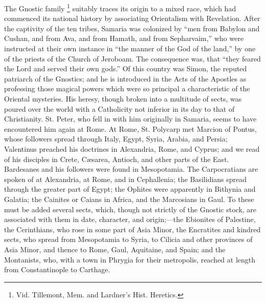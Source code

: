 The Gnostic family \footnote{Vid. Tillemont, Mem. and
Lardner's Hist. Heretics.} suitably traces its origin
to a mixed race, which had commenced its national history
by associating Orientalism with Revelation. After the
captivity of the ten tribes, Samaria was colonized by
``men from Babylon and Cushan, and from Ava, and from
Hamath, and from Sepharvaim,'' who were instructed at
their own instance in ``the manner of the God of the
land,'' by one of the priests of the Church of
Jeroboam. The consequence was, that ``they feared the
Lord and served their own gods.'' Of this country was
Simon, the reputed patriarch of the Gnostics; and he is
introduced in the Acts of the Apostles as professing
those magical powers which were so principal a
characteristic of the Oriental mysteries. His heresy,
though broken into a multitude of sects, was poured over
the world with a Catholicity not inferior in its day to
that of Christianity. St. Peter, who fell in with him
originally in Samaria, seems to have encountered him
again at Rome. At Rome, St. Polycarp met Marcion of
Pontus, whose followers spread through Italy, Egypt,
Syria, Arabia, and Persia; Valentinus preached his
doctrines in Alexandria, Rome, and Cyprus; and we read of
his disciples in Crete, Cæsarea, Antioch, and other
parts of the East. Bardesanes and his followers were
found in Mesopotamia. The Carpocratians are spoken of at
Alexandria, at Rome, and in Cephallenia; the Basilidians
spread through the greater part of Egypt; the Ophites
were apparently in Bithynia and Galatia; the Cainites or
Caians in Africa, and the Marcosians in Gaul. To these
must be added several sects, which, though not strictly
of the Gnostic stock, are associated with them in date,
character, and origin;—the Ebionites of Palestine,
the Cerinthians, who rose in some part of Asia Minor, the
Encratites and kindred sects, who spread from Mesopotamia
to Syria, to Cilicia and other provinces of Asia Minor,
and thence to Rome, Gaul, Aquitaine, and Spain; and the
Montanists, who, with a town in Phrygia for their
metropolis, reached at length from Constantinople to
Carthage.

